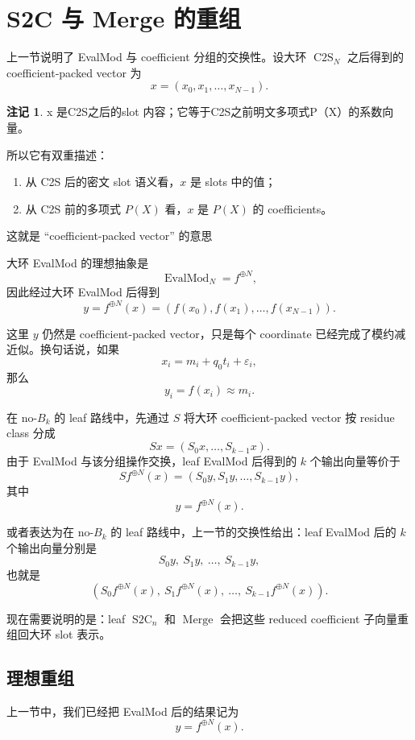 \documentclass[UTF8,11pt]{ctexart}
\theoremstyle{definition}
\newtheorem{remark}{注记}
\newcommand{\CtwoS}{\operatorname{C2S}}
\newcommand{\StwoC}{\operatorname{S2C}}
\newcommand{\Merge}{\operatorname{Merge}}
\newcommand{\EvalMod}{\operatorname{EvalMod}}
\begin{document}
\section{S2C 与 Merge 的重组}

上一节说明了 EvalMod 与 coefficient 分组的交换性。设大环 \(\CtwoS_N\) 之后得到的 coefficient-packed vector 为
\[
x=(x_0,x_1,\ldots,x_{N-1}).
\]

\begin{remark}
    
    x 是C2S之后的slot 内容；它等于C2S之前明文多项式P（X）的系数向量。

    所以它有双重描述：

\begin{enumerate}
    \item 从 C2S 后的密文 slot 语义看，$x$ 是 slots 中的值；
    \item 从 C2S 前的多项式 $P(X)$ 看，$x$ 是 $P(X)$ 的 coefficients。
\end{enumerate}

这就是 “coefficient-packed vector” 的意思

\end{remark}
大环 EvalMod 的理想抽象是
\[
\EvalMod_N=f^{\oplus N},
\]
因此经过大环 EvalMod 后得到
\[
y=f^{\oplus N}(x)
=
(f(x_0),f(x_1),\ldots,f(x_{N-1})).
\]

这里 \(y\) 仍然是 coefficient-packed vector，只是每个 coordinate 已经完成了模约减近似。换句话说，如果
\[
x_i=m_i+q_0t_i+\varepsilon_i,
\]
那么
\[
y_i=f(x_i)\approx m_i.
\]

在 no-\(B_k\) 的 leaf 路线中，先通过 \(S\) 将大环 coefficient-packed vector 按 residue class 分成
\[
Sx=(S_0x,\ldots,S_{k-1}x).
\]
由于 EvalMod 与该分组操作交换，leaf EvalMod 后得到的 \(k\) 个输出向量等价于
\[
S f^{\oplus N}(x)
=
(S_0y,S_1y,\ldots,S_{k-1}y),
\]
其中
\[
y=f^{\oplus N}(x).
\]


或者表达为在 no-\(B_k\) 的 leaf 路线中，上一节的交换性给出：leaf EvalMod 后的 \(k\) 个输出向量分别是
\[
S_0y,\ S_1y,\ \ldots,\ S_{k-1}y,
\]
也就是
\[
(S_0 f^{\oplus N}(x),\ S_1 f^{\oplus N}(x),\ \ldots,\ S_{k-1} f^{\oplus N}(x)).
\]

现在需要说明的是：leaf \(\StwoC_n\) 和 \(\Merge\) 会把这些 reduced coefficient 子向量重组回大环 slot 表示。
\subsection{理想重组}

上一节中，我们已经把 EvalMod 后的结果记为
\[
y=f^{\oplus N}(x).
\]
\end{document}
